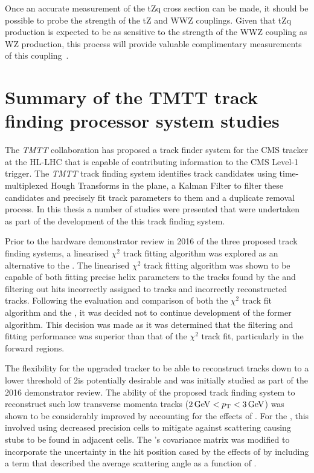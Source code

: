 Once an accurate measurement of the tZq cross section can be made, it should be possible to probe the strength of the tZ and WWZ couplings.
Given that tZq production is expected to be as sensitive to the strength of the WWZ coupling as WZ production, this process will provide valuable complimentary measurements of this coupling~\cite{Campbell:2013yla}.

\section{Summary of the TMTT track finding processor system studies}
The \emph{TMTT} collaboration has proposed a track finder system for the CMS tracker at the HL-LHC that is capable of contributing information to the CMS Level-1 trigger.
The \emph{TMTT} track finding system identifies track candidates using time-multiplexed Hough Transforms in the \rphi plane, a Kalman Filter to filter these candidates and precisely fit track parameters to them and a duplicate removal process.
In this thesis a number of studies were presented that were undertaken as part of the development of the this track finding system.

Prior to the hardware demonstrator review in 2016 of the three proposed track finding systems, a linearised $\chi^{2}$ track fitting algorithm was explored as an alternative to the \KF.
The linearised $\chi^{2}$ track fitting algorithm was shown to be capable of both fitting precise helix parameters to the tracks found by the \HT and filtering out hits incorrectly assigned to tracks and incorrectly reconstructed tracks.
Following the evaluation and comparison of both the $\chi^{2}$ track fit algorithm and the \KF, it was decided not to continue development of the former algorithm.
This decision was made as it was determined that the \KF filtering and fitting performance was superior than that of the $\chi^{2}$ track fit, particularly in the forward regions.

The flexibility for the upgraded tracker to be able to reconstruct tracks down to a lower \pT threshold of 2\GeV is potentially desirable and was initially studied as part of the 2016 demonstrator review.
The ability of the proposed track finding system to reconstruct such low transverse momenta tracks ($2\,\text{Ge\hspace{-.08em}V} < p_{\mathrm{T}} < 3\,\text{Ge\hspace{-.08em}V}$) was shown to be considerably improved by accounting for the effects of \MS. 
For the \HT, this involved using decreased precision \HT cells to mitigate against scattering causing stubs to be found in adjacent cells.
The \KF's covariance matrix was modified to incorporate the uncertainty in the hit position cased by the effects of \MS by including a term that described the average scattering angle as a function of \pT.

